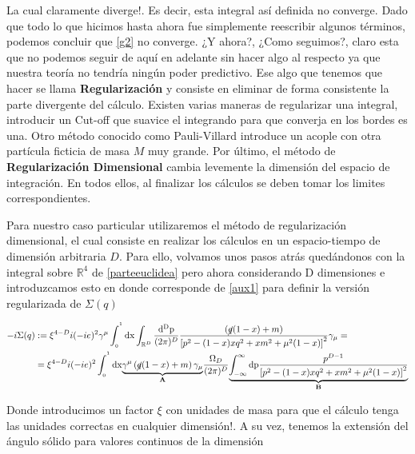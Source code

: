 \documentclass{article}
\numberwithin{equation}{section}
\begin{document}
La cual claramente diverge!. Es decir, esta integral así definida no converge. Dado que todo lo que hicimos hasta ahora fue simplemente reescribir
algunos términos, podemos concluir que \ref{g2} no converge. ¿Y
ahora?, ¿Como seguimos?, claro esta que no podemos seguir de aquí
en adelante sin hacer algo al respecto ya que nuestra teoría no tendría ningún poder predictivo. 
Ese algo que tenemos que hacer se llama \textbf{Regularización} y consiste en eliminar de forma consistente la parte divergente del cálculo. Existen varias maneras de regularizar una integral,
introducir un Cut-off que suavice el integrando para que converja
en los bordes es una. Otro método conocido como Pauli-Villard introduce un acople
con otra partícula ficticia de masa $ M $ muy grande. Por último, el método de \textbf{Regularización Dimensional} cambia levemente la dimensión del espacio de integración.
En todos ellos, al finalizar los cálculos se deben tomar los limites
correspondientes. 

Para nuestro caso particular utilizaremos el método
de regularización dimensional, el cual consiste en realizar los cálculos en un espacio-tiempo de dimensión arbitraria $ D $. Para ello, volvamos unos pasos atrás quedándonos con la integral sobre $ \mathbb{R}^4 $ de \ref{parteeuclidea} pero ahora considerando D dimensiones e introduzcamos esto en donde corresponde de \ref{aux1} para definir la versión regularizada de $ \Sigma(q) $

\begin{equation}\label{aux2}
\begin{aligned}
-i\Sigma(q)&:=\xi^{4-D}i(-ie)^{2}\gamma^{\mu}\int_{_{0}}^{^{1}}\mathrm{dx}\int_{\mathbb{R}^{D}}\frac{\mathrm{d^{D}p}}{(2\pi)^{D}}\frac{\left(\cancel{q}(1-x)+m\right)}{\left[p^{2}-(1-x)xq^{2} + x m^{2} + \mu^{2}(1-x)\right]^{2}} \gamma_{\mu}=\\
&=\xi^{4-D} i(-ie)^{2}\int_{_{0}}^{^{1}}\mathrm{dx}\underset{\textbf{A}}{\underbrace{\gamma^{\mu}\left(\cancel{q}(1-x)+m\right) \gamma_{\mu}}}\frac{\Omega_D}{(2\pi)^{D}}\underset{\textbf{B}}{\underbrace{\int_{-\infty}^{\infty}\mathrm{dp}\frac{p^{D-1}}{\left[p^{2}-(1-x)xq^{2} + x m^{2} + \mu^{2}(1-x)\right]^{2}}}}
\end{aligned}
\end{equation}

Donde introducimos un factor $ \xi $ con unidades de masa para que el cálculo tenga las unidades correctas en cualquier dimensión!. A su vez, tenemos la extensión del ángulo sólido para valores continuos de la dimensión
\end{document}
